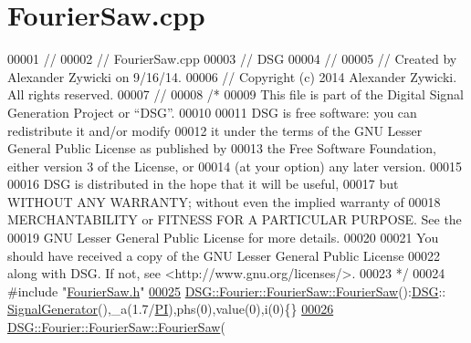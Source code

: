 \hypertarget{_fourier_saw_8cpp_source}{\section{Fourier\+Saw.\+cpp}
\label{_fourier_saw_8cpp_source}
}

\begin{DoxyCode}
00001 \textcolor{comment}{//}
00002 \textcolor{comment}{//  FourierSaw.cpp}
00003 \textcolor{comment}{//  DSG}
00004 \textcolor{comment}{//}
00005 \textcolor{comment}{//  Created by Alexander Zywicki on 9/16/14.}
00006 \textcolor{comment}{//  Copyright (c) 2014 Alexander Zywicki. All rights reserved.}
00007 \textcolor{comment}{//}
00008 \textcolor{comment}{/*}
00009 \textcolor{comment}{ This file is part of the Digital Signal Generation Project or “DSG”.}
00010 \textcolor{comment}{}
00011 \textcolor{comment}{ DSG is free software: you can redistribute it and/or modify}
00012 \textcolor{comment}{ it under the terms of the GNU Lesser General Public License as published by}
00013 \textcolor{comment}{ the Free Software Foundation, either version 3 of the License, or}
00014 \textcolor{comment}{ (at your option) any later version.}
00015 \textcolor{comment}{}
00016 \textcolor{comment}{ DSG is distributed in the hope that it will be useful,}
00017 \textcolor{comment}{ but WITHOUT ANY WARRANTY; without even the implied warranty of}
00018 \textcolor{comment}{ MERCHANTABILITY or FITNESS FOR A PARTICULAR PURPOSE.  See the}
00019 \textcolor{comment}{ GNU Lesser General Public License for more details.}
00020 \textcolor{comment}{}
00021 \textcolor{comment}{ You should have received a copy of the GNU Lesser General Public License}
00022 \textcolor{comment}{ along with DSG.  If not, see <http://www.gnu.org/licenses/>.}
00023 \textcolor{comment}{ */}
00024 \textcolor{preprocessor}{#include "\hyperlink{_fourier_saw_8h}{FourierSaw.h}"}
\hypertarget{_fourier_saw_8cpp_source_l00025}{}\hyperlink{class_d_s_g_1_1_fourier_1_1_fourier_saw_acfef03c4384ef656110c51102e346c49}{00025} \hyperlink{class_d_s_g_1_1_fourier_1_1_fourier_saw_acfef03c4384ef656110c51102e346c49}{DSG::Fourier::FourierSaw::FourierSaw}():\hyperlink{namespace_d_s_g}{DSG}::
      \hyperlink{class_d_s_g_1_1_signal_generator}{SignalGenerator}(),\_a(1.7/\hyperlink{_p_i_8h_a598a3330b3c21701223ee0ca14316eca}{PI}),phs(0),value(0),i(0)\{\}
\hypertarget{_fourier_saw_8cpp_source_l00026}{}\hyperlink{class_d_s_g_1_1_fourier_1_1_fourier_saw_a6062c388900f32e1cfd6df95b9760065}{00026} \hyperlink{class_d_s_g_1_1_fourier_1_1_fourier_saw_acfef03c4384ef656110c51102e346c49}{DSG::Fourier::FourierSaw::FourierSaw}(

\end{DoxyCode}
